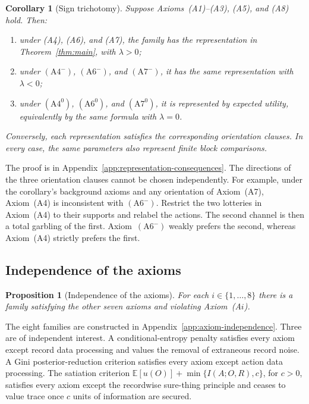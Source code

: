 \documentclass[11pt,a4paper]{article}
\newtheorem{proposition}[theorem]{Proposition}
\newtheorem{corollary}[theorem]{Corollary}
\theoremstyle{definition}
\newcommand{\E}{\mathbb E}
\newcommand{\1}{\mathbf 1}
\begin{document}
\begin{corollary}[Sign trichotomy]\label{cor:signduality}
Suppose Axioms~\textup{(A1)--(A3)}, \textup{(A5)}, and
\textup{(A8)} hold.  Then:
\begin{enumerate}[label=\textup{(\roman*)},leftmargin=*]
\item under \textup{(A4)}, \textup{(A6)}, and \textup{(A7)}, the family has the representation in
Theorem~\ref{thm:main}, with $\lambda>0$;
\item under $(\mathrm{A}4^-)$, $(\mathrm{A}6^-)$, and $(\mathrm{A}7^-)$, it has the same representation with
$\lambda<0$;
\item under $(\mathrm{A}4^0)$, $(\mathrm{A}6^0)$, and $(\mathrm{A}7^0)$, it is represented by expected utility,
equivalently by the same formula with $\lambda=0$.
\end{enumerate}
Conversely, each representation satisfies the corresponding orientation clauses.
In every case, the same parameters also represent finite block comparisons.
\end{corollary}

The proof is in Appendix~\ref{app:representation-consequences}.  The directions of the three orientation clauses cannot be chosen independently.  For example, under the
corollary's background axioms and any orientation of Axiom~\textup{(A7)}, Axiom~\textup{(A4)} is inconsistent
with $(\mathrm{A}6^-)$.  Restrict the two lotteries in Axiom~\textup{(A4)} to their supports and relabel the
actions.  The second channel is then a total garbling of the first.  Axiom~$(\mathrm{A}6^-)$ weakly prefers the
second, whereas Axiom~\textup{(A4)} strictly prefers the first.


\subsection{Independence of the axioms}

\begin{proposition}[Independence of the axioms]\label{prop:independence}
For each $i\in\{1,\ldots,8\}$ there is a family satisfying the other seven axioms and violating
Axiom~\textup{(A$i$)}.
\end{proposition}

The eight families are constructed in Appendix~\ref{app:axiom-independence}.  Three are of independent interest.  A conditional-entropy penalty satisfies every axiom except record data processing and values the removal of
extraneous record noise.  A Gini posterior-reduction criterion satisfies every axiom except action data processing.
The satiation criterion $\E[u(O)]+\min\{I(A;O,R),c\}$, for $c>0$, satisfies every axiom except the recordwise
sure-thing principle and ceases to value trace once $c$ units of information are secured.
\end{document}
